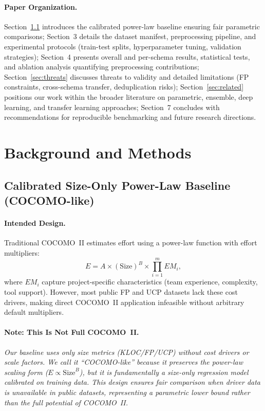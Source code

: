 \documentclass{ieeeaccess}
\begin{document}
\paragraph{Paper Organization.}
Section~\ref{sec:baseline} introduces the calibrated power-law baseline ensuring fair parametric comparisons;
Section~3 details the dataset manifest, preprocessing pipeline, and experimental protocols (train-test splits, hyperparameter tuning, validation strategies);
Section~4 presents overall and per-schema results, statistical tests, and ablation analysis quantifying preprocessing contributions;
Section~\ref{sec:threats} discusses threats to validity and detailed limitations (FP constraints, cross-schema transfer, deduplication risks);
Section~\ref{sec:related} positions our work within the broader literature on parametric, ensemble, deep learning, and transfer learning approaches;
Section~7 concludes with recommendations for reproducible benchmarking and future research directions.

\section{Background and Methods}
\subsection{Calibrated Size-Only Power-Law Baseline (COCOMO-like)}
\label{sec:baseline}

\paragraph{Intended Design.}
Traditional COCOMO~II estimates effort using a power-law function with effort multipliers:
\begin{equation}
E = A \times (\text{Size})^{B} \times \prod_{i=1}^{m} EM_i,
\label{eq:cocomo-full}
\end{equation}
where $EM_i$ capture project-specific characteristics (team experience, complexity, tool support). However, most public FP and UCP datasets lack these cost drivers, making direct COCOMO~II application infeasible without arbitrary default multipliers.

\paragraph{Note: This Is Not Full COCOMO~II.}
\textit{Our baseline uses only size metrics (KLOC/FP/UCP) without cost drivers or scale factors. We call it ``COCOMO-like'' because it preserves the power-law scaling form ($E \propto \text{Size}^B$), but it is fundamentally a size-only regression model calibrated on training data. This design ensures fair comparison when driver data is unavailable in public datasets, representing a parametric lower bound rather than the full potential of COCOMO~II.}
\end{document}
